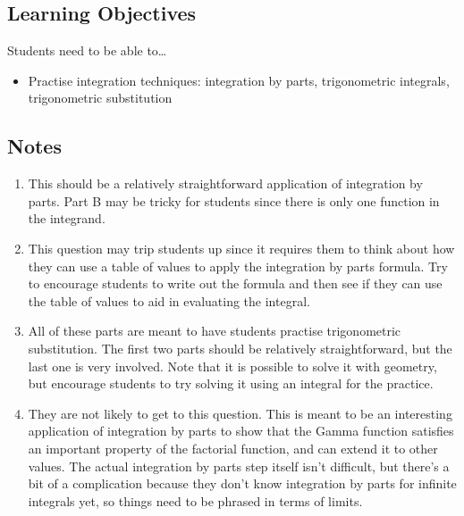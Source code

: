 \subsection*{Learning Objectives}
	Students need to be able to\ldots
	\begin{itemize}
		\item Practise integration techniques: integration by parts, trigonometric integrals, trigonometric substitution
	\end{itemize}

\subsection*{Notes}
	\begin{enumerate}
			\item This should be a relatively straightforward application of integration by parts. Part B may be tricky for students since there is only one function in the integrand.

            \item This question may trip students up since it requires them to think about how they can use a table of values to apply the integration by parts formula. Try to encourage students to write out the formula and then see if they can use the table of values to aid in evaluating the integral.

            \item All of these parts are meant to have students practise trigonometric substitution. The first two parts should be relatively straightforward, but the last one is very involved. Note that it is possible to solve it with geometry, but encourage students to try solving it using an integral for the practice.

            \item They are not likely to get to this question. This is meant to be an interesting application of integration by parts to show that the Gamma function satisfies an important property of the factorial function, and can extend it to other values. The actual integration by parts step itself isn't difficult, but there's a bit of a complication because they don't know integration by parts for infinite integrals yet, so things need to be phrased in terms of limits. 
	\end{enumerate}
